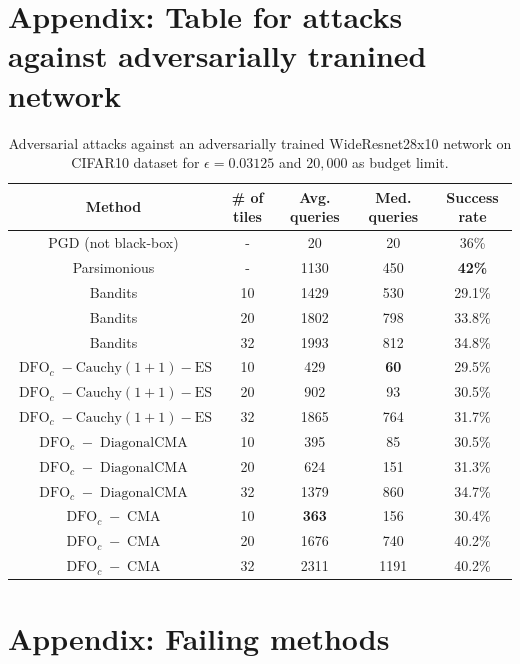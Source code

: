 \section{Appendix: Table for attacks against adversarially tranined network}
\begin{table}[htb]
\caption{Adversarial attacks against an adversarially trained WideResnet28x10 network on CIFAR10 dataset for $\epsilon=0.03125$ and $20,000$ as budget limit.}
\label{at_comp}
\begin{center}
\begin{tabular}{cc|cc|c}
\textbf{Method }& \textbf{\# of tiles} & \textbf{ Avg. queries} &\textbf{ Med. queries} &\textbf{ Success rate}\\
 \hline
PGD (not black-box)& - & 20 &20& 36\% \\
\hline

Parsimonious&-&1130 & 450&\textbf{42\%}\\
\hline
Bandits&10& 1429& {530} &29.1\%\\
 Bandits&20 &1802&798& 33.8\%\\
Bandits&32 &1993& 812& 34.8\%\\
\hline
$\operatorname{DFO}_c-\operatorname{Cauchy (1+1)-ES}$&10& 429& {\textbf{60}} &29.5\%\\
$\operatorname{DFO}_c-\operatorname{Cauchy (1+1)-ES}$& 20&902 & 93  &30.5\%\\
$\operatorname{DFO}_c-\operatorname{Cauchy (1+1)-ES}$&32 &1865 &764 & 31.7\%\\
$\operatorname{DFO}_c-\operatorname{Diagonal CMA}$ &10&395 &85&30.5\%\\
$\operatorname{DFO}_c-\operatorname{Diagonal CMA}$&20 &624& 151& 31.3\% \\
$\operatorname{DFO}_c-\operatorname{Diagonal CMA}$& 32 &1379 &860& 34.7\%\\
$\operatorname{DFO}_c-\operatorname{CMA}$ &10& {\textbf{363}} & 156&30.4\%\\
$\operatorname{DFO}_c-\operatorname{CMA}$&20 &1676&740& 40.2\% \\
$\operatorname{DFO}_c-\operatorname{CMA}$& 32 &2311 &1191& 40.2\%\\
\end{tabular}
\end{center}
\end{table}

\newpage


\section{Appendix: Failing methods}

